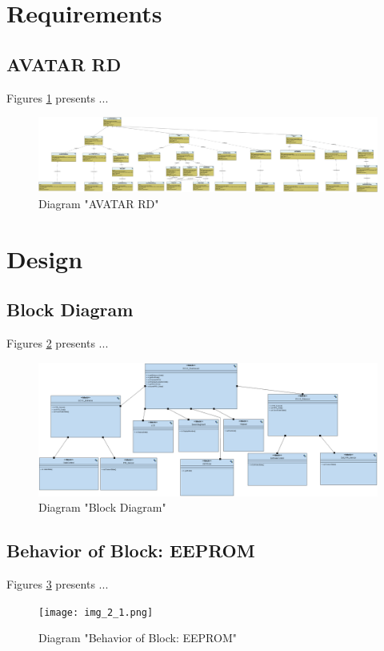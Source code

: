 \section{Requirements}
\subsection{AVATAR RD}
Figures \ref{fig:AVATAR RDAVATAR RD10} presents ...
\begin{figure}[htb]
\centering
\includegraphics[width=\textwidth]{img_1_0.png}
\caption{Diagram "AVATAR RD"}
\label{fig:AVATAR RDAVATAR RD10}
\end{figure}

\section{Design}
\subsection{Block Diagram}
Figures \ref{fig:Block DiagramBlock Diagram20} presents ...
\begin{figure}[htb]
\centering
\includegraphics[width=\textwidth]{img_2_0.png}
\caption{Diagram "Block Diagram"}
\label{fig:Block DiagramBlock Diagram20}
\end{figure}

\subsection{Behavior of Block: EEPROM}
Figures \ref{fig:EEPROMEEPROM21} presents ...
\begin{figure}[htb]
\centering
\texttt{[image: img\_2\_1.png]}
\caption{Diagram "Behavior of Block: EEPROM"}
\label{fig:EEPROMEEPROM21}
\end{figure}

